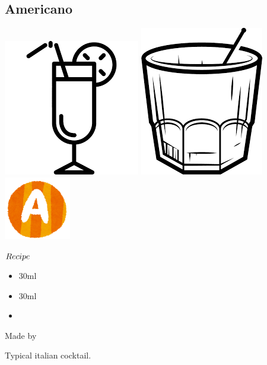 \subsection{Americano}
\vspace{-7mm}
\hspace{34mm}
\includegraphics[scale=.07]{cocktail_glass_tall.png}
\includegraphics[scale=.06]{cocktail_glass_rock.png}
\includegraphics[scale=.12]{capital_a.png}
\vspace{2.5mm}
\begin{itembox}[l]{\boldmath $Recipe$}
\begin{itemize}
\setlength{\parskip}{0cm}
\setlength{\itemsep}{0cm}
\item \campari 30ml
\item \svermouth 30ml
\item \soda
\end{itemize}
\vspace{-4mm}
Made by \build
\end{itembox}
Typical italian cocktail.
